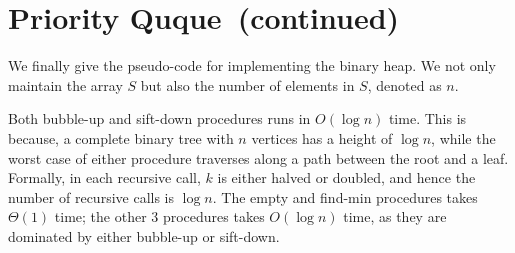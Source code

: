 \section*{Priority Quque~(continued)}

We finally give the pseudo-code for implementing the binary heap.
We not only maintain the array $S$ but also the number of elements in $S$, denoted as $n$.

\begin{minipage}{0.8\textwidth}
	\xxx
	\xxx
	\xxx
	\xxx
\end{minipage}

\begin{minipage}{0.8\textwidth}
	\xxx
	\xxx
	\xxx
	\xxx
	\xxx
\end{minipage}

\begin{minipage}{0.8\textwidth}
	\xxx
	\xxx
	\xxx
\end{minipage}

\begin{minipage}{0.8\textwidth}
	\xxx
	\xxx
	\xxx
	\xxx
	\xxx
\end{minipage}

\begin{minipage}{0.8\textwidth}
	\xxx
	\xxx
	\xxx
	\xxx
\end{minipage}

Both bubble-up and sift-down procedures runs in $O(\log n)$ time.
This is because, a complete binary tree with $n$ vertices has a height of $\log n$, while
the worst case of either procedure traverses along a path between the root and a leaf.
Formally, in each recursive call, $k$ is either halved or doubled, and hence the number
of recursive calls is $\log n$.
The empty and find-min procedures takes $\Theta(1)$ time; the other 3 procedures takes $O(\log n)$ time, as they are dominated by either bubble-up or sift-down.

